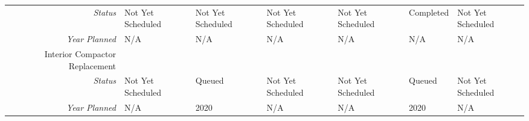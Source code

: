 \begin{tabularx}{\textwidth}{r|X|X|X|X|X|X|}
    \multicolumn{1}{|r|}{\cellcolor{ccorangelight}\textit{Status}}                & Not Yet Scheduled                                                         & Not Yet Scheduled                                                         & Not Yet Scheduled                                                         & Not Yet Scheduled                                                         & Completed                                                         & Not Yet Scheduled                                                         \\
    \multicolumn{1}{|r|}{\cellcolor{ccorangelight}\textit{Year Planned}}                  & N/A                                                     & N/A                                                     & N/A                                                     & N/A                                                     & N/A                                                     & N/A                                                     \\ \hline
\multicolumn{1}{|V{.2\columnwidth}|}{\cellcolor{ccorangelight}Interior Compactor Replacement}          &                                                                  &                                                                  &                                                                  &                                                                  &                                                                  &                                                                  \\
    \multicolumn{1}{|r|}{\cellcolor{ccorangelight}\textit{Status}}                & Not Yet Scheduled                                                         & Queued                                                         & Not Yet Scheduled                                                         & Not Yet Scheduled                                                         & Queued                                                         & Not Yet Scheduled                                                         \\
    \multicolumn{1}{|r|}{\cellcolor{ccorangelight}\textit{Year Planned}}                  & N/A                                                     & 2020                                                     & N/A                                                     & N/A                                                     & 2020                                                     & N/A                                                     \\ \hline

\end{tabularx}
